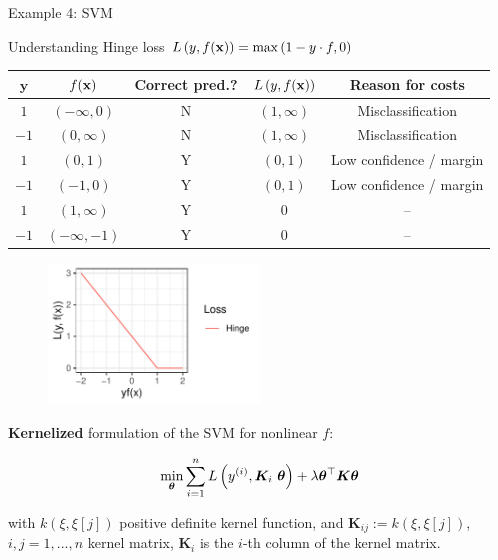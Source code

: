 \begin{vbframe}{Example 4: SVM}
\framebreak 

Understanding Hinge loss $L\left(y, f(\mathbf{x})\right) = \max\left(1 - y\cdot f, 0\right)$

\begin{footnotesize}
\begin{center}
\begin{tabular}{ c | c | c | c | c }
$\mathbf{y}$ & $f(\mathbf{x})$ &  \textbf{Correct pred.?}  & $L\left(y, f(\mathbf{x})\right)$ & \textbf{Reason for costs}  \\ \hline
 $1$ & $(- \infty, 0)$  & N & $(1, \infty)$ & Misclassification \\
 $- 1$ & $(0, \infty)$ & N  & $(1, \infty)$ &  Misclassification \\
 $1$ & $(0, 1)$ & Y & $(0, 1)$ & Low confidence / margin \\
 $- 1$ & $(-1, 0)$  & Y  & $(0, 1)$& Low confidence / margin\\
 $1$ & $(1, \infty)$ &  Y & $0$ & -- \\
 $- 1$ & $(- \infty, -1)$ &  Y & $0$ & -- \\
\end{tabular}
\end{center}
\end{footnotesize}

\vspace*{-0.3cm}
\begin{figure}
	\begin{center}
		\includegraphics[width=0.5\textwidth]{figure_man/hinge.pdf}
	\end{center}
\end{figure}

\framebreak 

\textbf{Kernelized} formulation of the SVM for nonlinear $f$: 

\begin{eqnarray*}
	\min_{\bm{\theta}}\sum\limits_{i=1}^n L\left(y^{(i)}, \bm{K}_i ~\bm{\theta}\right) + \lambda \bm{\theta}^\top \bm{K} \bm{\theta} 
\end{eqnarray*}

with $k(\xi, \xi[j])$ positive definite kernel function, and $\bm{K}_{ij} := k(\xi, \xi[j])$, $i, j = 1, ..., n$ kernel matrix, $\bm{K}_i$ is the $i$-th column of the kernel matrix. 


\end{vbframe}
